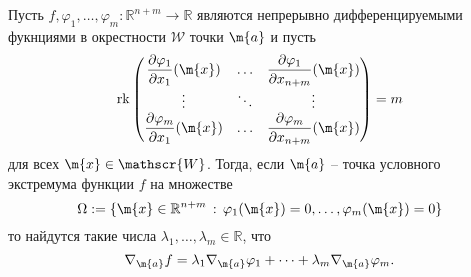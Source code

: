 \begin{theorem} Пусть $f, \varphi_1,\ldots, \varphi_m: \mathbb{R}^{n+m} \to \mathbb{R}$ являются непрерывно дифференцируемыми фукнциями в окрестности $\mathscr{W}$ точки $\m{a}$ и пусть 
    \[
     \mathrm{rk} \begin{pmatrix}
         \dfrac{\partial \varphi_1}{\partial x_1} (\m{x}) & \ldots & \dfrac{\partial \varphi_1}{\partial x_{n+m}} (\m{x}) \\
         \vdots & \ddots & \vdots \\
         \dfrac{\partial \varphi_m}{\partial x_1} (\m{x}) & \ldots & \dfrac{\partial \varphi_m}{\partial x_{n+m}} (\m{x})
     \end{pmatrix} = m
    \]
    для всех $\m{x}\in \mathscr{W}$. Тогда, если $\m{a}$ -- точка условного экстремума функции $f$ на множестве
    \[
     \Omega: = \{\m{x} \in \mathbb{R}^{n+m}\,:\, \varphi_1(\m{x}) =0, \ldots, \varphi_m(\m{x}) = 0\}
    \]
    то найдутся такие числа $\lambda_1,\ldots, \lambda_m \in \mathbb{R}$, что
    \[
     \nabla_\m{a} f = \lambda_1 \nabla_\m{a} \varphi_1 + \cdots +   \lambda_m \nabla_\m{a} \varphi_m.
     \]
\end{theorem}

